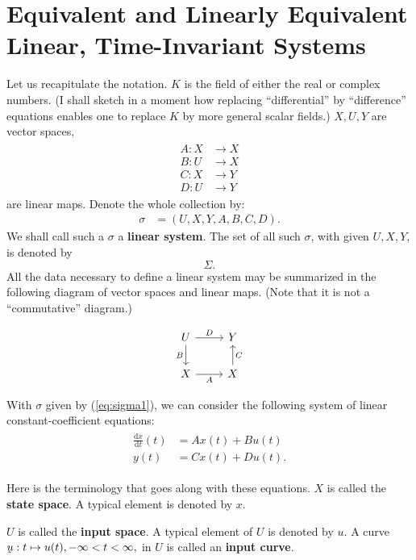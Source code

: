 \documentclass[12pt]{book}
\theoremstyle{plain}
\theoremstyle{definition}
\newcommand{\dd}[1]{\mathrm{d}#1}
\newcommand{\utilde}[1]{\underaccent{\tilde}{#1}}
\begin{document}
\section{Equivalent and Linearly Equivalent Linear, Time-Invariant Systems}

Let us recapitulate the notation.
$K$ is the field of either the real or complex numbers.
(I shall sketch in a moment how replacing ``differential'' by ``difference'' equations enables one to replace $K$ by more general scalar fields.)
$X, U, Y$ are vector spaces,
\begin{align*}
\begin{split}
    A: X &\to X \\
    B: U &\to X \\
    C: X &\to Y \\
    D: U &\to Y
\end{split}
\end{align*}
are linear maps.
Denote the whole collection by:
\begin{align} \label{eq:sigma1}
    \sigma &= (U, X, Y, A, B, C, D).
\end{align}
We shall call such a $\sigma$ a \textbf{linear system}. The set of all such $\sigma$, with given $U, X, Y$, is denoted by
$$\Sigma.$$
All the data necessary to define a linear system may be summarized in the following diagram of vector spaces and linear maps.
(Note that it is not a ``commutative'' diagram.)

\begin{equation*}
\begin{tikzcd}
U \ar[r,"D"] \ar[d,"B"'] & Y \\
X \ar[r,"A"'] & X \ar[u,"C"']
\end{tikzcd}
\end{equation*}

With $\sigma$ given by (\ref{eq:sigma1}), we can consider the following system of linear constant-coefficient equations:
\begin{align}
\begin{split} \label{eq:LinearODESystem1}
    \frac{\dd{x}}{\dd{t}}(t) &= Ax(t) + Bu(t) \\
    y(t) &= Cx(t) + Du(t).
\end{split}
\end{align}

Here is the terminology that goes along with these equations.
$X$ is called the \textbf{state space}.
A typical element is denoted by $x$.

$U$ is called the \textbf{input space}.
A typical element of $U$ is denoted by $u$.
A curve $\utilde{u}: t \mapsto u(t), -\infty < t < \infty,$ in $U$ is called an \textbf{input curve}.
\end{document}
